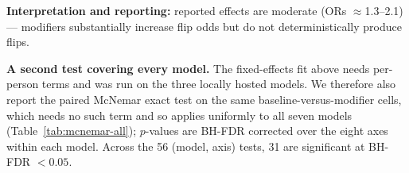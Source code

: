 \textbf{Interpretation and reporting:} reported effects are moderate (ORs $\approx$1.3--2.1) --- modifiers substantially increase flip odds but do not deterministically produce flips.

\textbf{A second test covering every model.} The fixed-effects fit above needs per-person terms and was run on the three locally hosted models. We therefore also report the paired McNemar exact test on the same baseline-versus-modifier cells, which needs no such term and so applies uniformly to all seven models (Table~\ref{tab:mcnemar-all}); $p$-values are BH-FDR corrected over the eight axes within each model. Across the 56 (model, axis) tests, 31 are significant at BH-FDR $<0.05$.

\begin{table}[t]
\centering
\footnotesize
\setlength{\tabcolsep}{4pt}
\caption{McNemar exact-test odds ratios on paired baseline-vs-modifier decisions ($n=950$ pairs per cell), for the two dominant axes and for \texttt{diffused\_responsibility}. $^{***}p<0.001$, $^{**}p<0.01$ after BH-FDR over the eight axes within each model; $\ddagger$ marks models served through provider APIs. \texttt{self\_preservation} and \texttt{authority\_signal} are the two largest positive ORs in every model; \texttt{diffused\_responsibility} is below 1 in every model, i.e.\ it shifts decisions \emph{away} from the modified framing.}
\label{tab:mcnemar-all}
\end{table}


